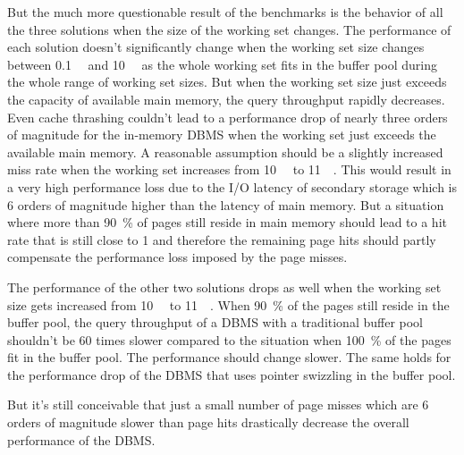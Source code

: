 	But the much more questionable result of the benchmarks is the behavior of all the three solutions when the size of the working set changes. The performance of each solution doesn't significantly change when the working set size changes between \SI{0.1}{\giga\byte} and \SI{10}{\giga\byte} as the whole working set fits in the buffer pool during the whole range of working set sizes. But when the working set size just exceeds the capacity of available main memory, the query throughput rapidly decreases. Even cache thrashing couldn't lead to a performance drop of nearly three orders of magnitude for the in-memory DBMS when the working set just exceeds the available main memory. A reasonable assumption should be a slightly increased miss rate when the working set increases from \SI{10}{\giga\byte} to \SI{11}{\giga\byte}. This would result in a very high performance loss due to the I/O latency of secondary storage which is 6 orders of magnitude higher than the latency of main memory. But a situation where more than \SI{90}{\percent} of pages still reside in main memory should lead to a hit rate that is still close to 1 and therefore the remaining page hits should partly compensate the performance loss imposed by the page misses.
	
	The performance of the other two solutions drops as well when the working set size gets increased from \SI{10}{\giga\byte} to \SI{11}{\giga\byte}. When \SI{90}{\percent} of the pages still reside in the buffer pool, the query throughput of a DBMS with a traditional buffer pool shouldn't be 60 times slower compared to the situation when \SI{100}{\percent} of the pages fit in the buffer pool. The performance should change slower. The same holds for the performance drop of the DBMS that uses pointer swizzling in the buffer pool.
	
	But it's still conceivable that just a small number of page misses which are 6 orders of magnitude slower than page hits drastically decrease the overall performance of the DBMS.

